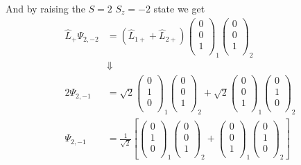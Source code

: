 \documentclass[11pt]{article}
\numberwithin{equation}{section}
\begin{document}
And by raising the $S=2$ $S_z=-2$ state we get
\begin{align*}
\hat{L}_{+}\Psi_{2,-2} &= (\hat{L}_{1+}+\hat{L}_{2+})\left(\begin{array}{c} 0\\ 0\\ 1\\\end{array}\right)_{1}\left(\begin{array}{c} 0\\ 0\\ 1\\\end{array}\right)_{2} \\
&\Downarrow\\
2\Psi_{2,-1} &= \sqrt{2}\left(\begin{array}{c} 0\\ 1\\ 0\\\end{array}\right)_{1}\left(\begin{array}{c} 0\\ 0\\ 1\\\end{array}\right)_{2} +
\sqrt{2}\left(\begin{array}{c} 0\\ 0\\ 1\\\end{array}\right)_{1}\left(\begin{array}{c} 0\\ 1\\ 0\\\end{array}\right)_{2} \\
\Psi_{2,-1} &= \frac{1}{\sqrt{2}}\left[\left(\begin{array}{c} 0\\ 1\\ 0\\\end{array}\right)_{1}\left(\begin{array}{c} 0\\ 0\\ 1\\\end{array}\right)_{2} +
\left(\begin{array}{c} 0\\ 0\\ 1\\\end{array}\right)_{1}\left(\begin{array}{c} 0\\ 1\\ 0\\\end{array}\right)_{2}\right]
\end{align*}
\end{document}
